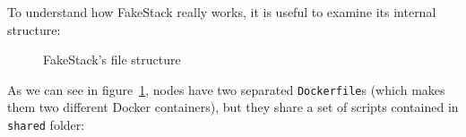 To understand how FakeStack really works, it is useful to examine its internal structure:

\begin{figure}[!ht]
\label{fig:fakestack_tree}
\caption{FakeStack's file structure}
\end{figure}

As we can see in figure~\ref{fig:fakestack_tree}, nodes have two separated \texttt{Dockerfile}s (which makes them two different Docker containers), but they share a set of scripts contained in \texttt{shared} folder:

